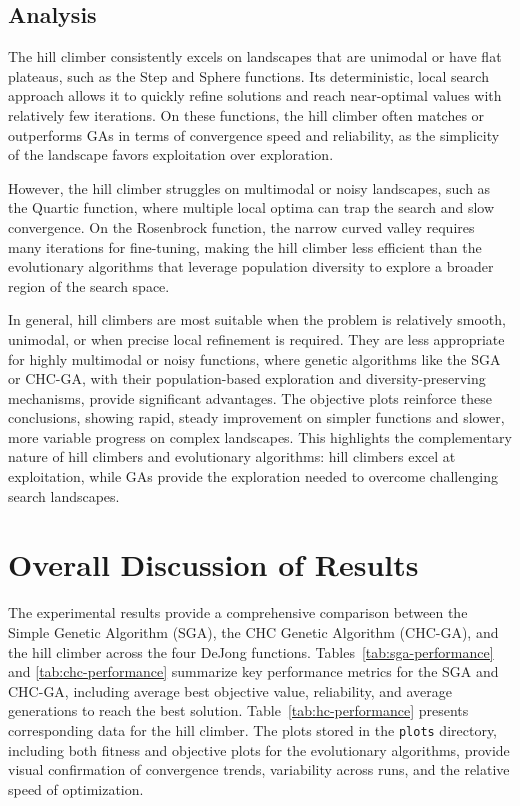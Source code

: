 \documentclass[11pt]{article}
\begin{document}
\subsection{Analysis}
The hill climber consistently excels on landscapes that are unimodal or have flat plateaus, such as the Step and Sphere functions. Its deterministic, local search approach allows it to quickly refine solutions and reach near-optimal values with relatively few iterations. On these functions, the hill climber often matches or outperforms GAs in terms of convergence speed and reliability, as the simplicity of the landscape favors exploitation over exploration.

However, the hill climber struggles on multimodal or noisy landscapes, such as the Quartic function, where multiple local optima can trap the search and slow convergence. On the Rosenbrock function, the narrow curved valley requires many iterations for fine-tuning, making the hill climber less efficient than the evolutionary algorithms that leverage population diversity to explore a broader region of the search space.

In general, hill climbers are most suitable when the problem is relatively smooth, unimodal, or when precise local refinement is required. They are less appropriate for highly multimodal or noisy functions, where genetic algorithms like the SGA or CHC-GA, with their population-based exploration and diversity-preserving mechanisms, provide significant advantages. The objective plots reinforce these conclusions, showing rapid, steady improvement on simpler functions and slower, more variable progress on complex landscapes. This highlights the complementary nature of hill climbers and evolutionary algorithms: hill climbers excel at exploitation, while GAs provide the exploration needed to overcome challenging search landscapes.

\section{Overall Discussion of Results}
\label{section-discussion}

The experimental results provide a comprehensive comparison between the Simple Genetic Algorithm (SGA), the CHC Genetic Algorithm (CHC-GA), and the hill climber across the four DeJong functions. Tables~\ref{tab:sga-performance} and \ref{tab:chc-performance} summarize key performance metrics for the SGA and CHC-GA, including average best objective value, reliability, and average generations to reach the best solution. Table~\ref{tab:hc-performance} presents corresponding data for the hill climber. The plots stored in the \texttt{plots} directory, including both fitness and objective plots for the evolutionary algorithms, provide visual confirmation of convergence trends, variability across runs, and the relative speed of optimization.
\end{document}
